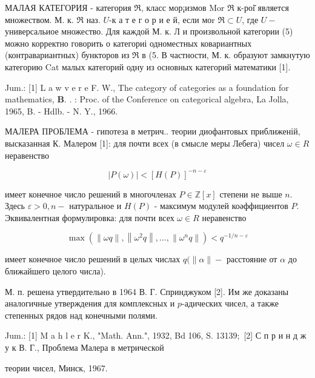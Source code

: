 \documentclass[10pt]{article}
\begin{document}
МАЛАЯ КАТЕГОРИЯ - категория $\Re$, класс мор¡измов Mor $\Re$ к-роі̆ является множеством. М. к. $\mathfrak{\Re}$ наз. $U$-к а т е г о р и е й, если моr $\Re \subset U$, где $U-$ универсальиое множество. Для каждой М. к. Л и произвольной категории (5) можно корректно говорить о категориі одноместных ковариантных (контравариантных) бункторов из $\mathfrak{R}$ в (5. В частности, М. к. образуют замкнутую категорию Cat малых категорий одну из основных категорий математики [1].



Jum.: [1] L a w v e r e F. W., The category of categories as a foundation for mathematics, $\mathbf{B}$. . : Proc. of the Conference on categorical algebra, La Jolla, 1965, B. - Hdlb. - N. Y., 1966.



МАЛЕРА ПРОБЛЕМА - гипотеза в метрич.. теории диофантовых приближеній, высказанная К. Малером [1]: для почти всех (в смысле меры Лебега) чисел $\omega \in R$ неравенство



\[

|P(\omega)|<[H(P)]^{-n-\varepsilon}

\]



имеет конечное число решений в многочленах $P \in \mathbb{Z}[x]$ степени не выше $n$. Здесь $\varepsilon>0, n-$ натуральное и $H(P)$ - максимум модулей коәффициентов $P$. Эквивалентная формулировка: для почти всех $\omega \in R$ неравенство



\[

\max \left(\|\omega q\|,\left\|\omega^{2} q\right\|, \ldots,\left\|\omega^{n} q\right\|\right)<q^{-1 / n-\varepsilon}

\]



имеет конечное число решений в целых числах $q(\|\alpha\|-$ расстояние от $\alpha$ до ближайшего целого числа).



М. п. решена утвердительно в 1964 В. Г. Спринджуком [2]. Им же доказаны аналогичные утверждения для комплексных и $p$-адических чисел, а также степенных рядов над конечными полями.



Jum.: [1] M a h l e r K., "Math. Ann.", 1932, Bd 106, S. 131$39 ;$ [2] С п р и н д ж у к В. Г., Проблема Малера в метрической

теории чисел, Минск, 1967.
\end{document}
